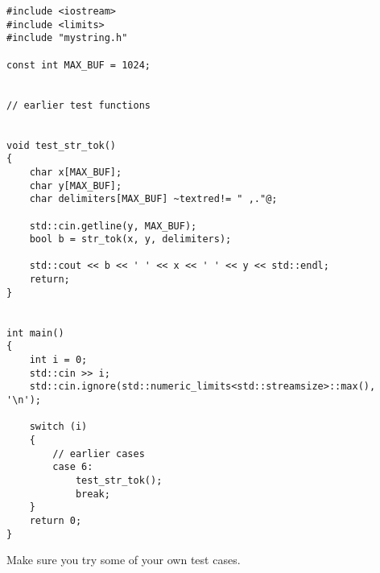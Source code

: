 \begin{Verbatim}[frame=single,fontsize=\small,commandchars=\~\!\@]
#include <iostream>
#include <limits>
#include "mystring.h"

const int MAX_BUF = 1024;


// earlier test functions


void test_str_tok()
{
    char x[MAX_BUF];
    char y[MAX_BUF];
    char delimiters[MAX_BUF] ~textred!= " ,."@;
    
    std::cin.getline(y, MAX_BUF);
    bool b = str_tok(x, y, delimiters);
    
    std::cout << b << ' ' << x << ' ' << y << std::endl;
    return;
}


int main()
{
    int i = 0;
    std::cin >> i;
    std::cin.ignore(std::numeric_limits<std::streamsize>::max(), '\n');

    switch (i)
    {
        // earlier cases
        case 6:
            test_str_tok();
            break;
    }
    return 0;
}
\end{Verbatim}

Make sure you try some of your own test cases.
